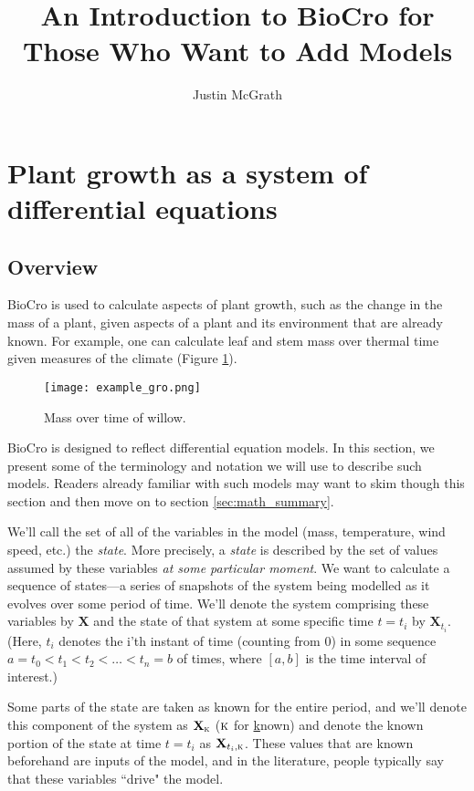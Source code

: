 \documentclass{article}
\title{An Introduction to BioCro for Those Who Want to Add Models}
\author{Justin McGrath}
\newcommand{\boldX}{\mathbf{X}}
\newcommand{\kn}{\textsc{k}} %
\begin{document}
\maketitle
\section{Plant growth as a system of differential equations}
\subsection{Overview}

BioCro is used to calculate aspects of plant growth, such as the
change in the mass of a plant, given aspects of a plant and its
environment that are already known. For example, one can calculate
leaf and stem mass over thermal time given measures of the climate
(Figure \ref{fig:example}).

\begin{figure}[!h]
\centering
\texttt{[image: example\_gro.png]}
\caption{\label{fig:example}Mass over time of willow.}
\end{figure}

BioCro is designed to reflect differential equation models. In this
section, we present some of the terminology and notation we will use
to describe such models.  Readers already familiar with such models
may want to skim though this section and then move on to section
\ref{sec:math_summary}.

We'll call the set of all of the variables in the model (mass,
temperature, wind speed, etc.) the \emph{state}. More precisely, a
\emph{state} is described by the set of values assumed by these
variables \emph{at some particular moment}.  We want to calculate a
sequence of states---a series of snapshots of the system being modelled
as it evolves over some period of time.  We'll denote the system
comprising these variables by $\boldX$ and the state of that system at
some specific time $t = t_i$ by $\boldX_{t_i}$.  (Here, $t_i$ denotes
the i'th instant of time (counting from 0) in some sequence $a = t_0 <
t_1 < t_2 < \dots < t_n = b$ of times, where $[a, b]$ is the time
interval of interest.)

Some parts of the state are taken as known for the entire period, and
we'll denote this component of the system as $\boldX_\kn$ ($\kn$ for
\underline{k}nown) and denote the known portion of the state at time
$t = t_i$ as $\boldX_{t_i,\kn}$. These values that are known
beforehand are inputs of the model, and in the literature, people
typically say that these variables ``drive" the model.
\end{document}
